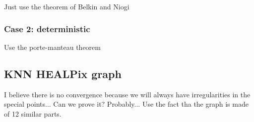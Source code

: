 Just use the theorem of Belkin and Niogi

\subsubsection*{Case 2: deterministic}

Use the porte-manteau theorem

\subsection*{KNN HEALPix graph}

I believe there is no convergence because we will always have irregularities
in the special points... Can we prove it? Probably... Use the fact
tha the graph is made of 12 similar parts.


